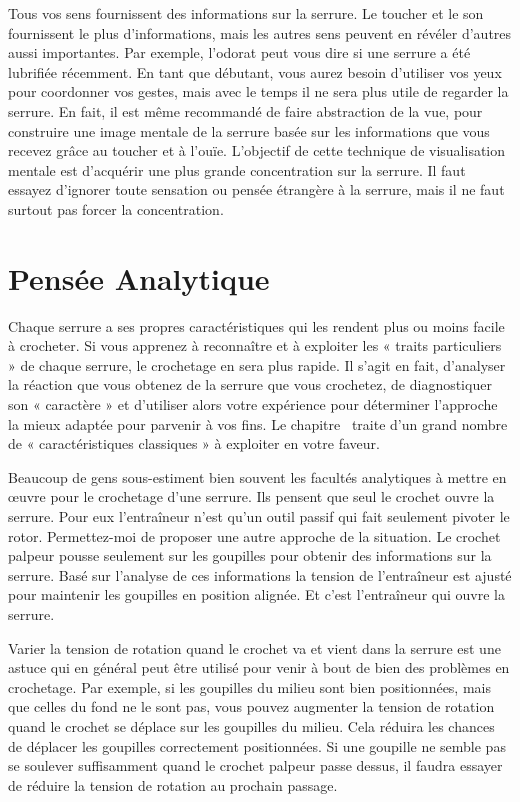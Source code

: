\documentclass[a4paper,french,11pt,twoside]{report}
\begin{document}
Tous vos sens fournissent des informations sur la serrure. Le toucher et le son fournissent le plus d'informations, mais les autres sens peuvent en révéler d'autres aussi importantes. Par exemple, l'odorat peut vous dire si une serrure a été lubrifiée récemment. En tant que débutant, vous aurez besoin d'utiliser vos yeux pour coordonner vos gestes, mais avec le temps il ne sera plus utile de regarder la serrure. En fait, il est même recommandé de faire abstraction de la vue, pour construire une image mentale de la serrure basée sur les informations que vous recevez grâce au toucher et à l'ouïe. L'objectif de cette technique de visualisation mentale est d'acquérir une plus grande concentration sur la serrure. Il faut essayez d'ignorer toute sensation ou pensée étrangère à la serrure, mais il ne faut surtout pas forcer la concentration.

\section{Pensée Analytique}

Chaque serrure a ses propres caractéristiques qui les rendent plus ou moins facile à crocheter. Si vous apprenez à reconnaître et à exploiter les « traits particuliers » de chaque serrure, le crochetage en sera plus rapide. Il s'agit en fait, d'analyser la réaction que vous obtenez de la serrure que vous crochetez, de diagnostiquer son « caractère » et d'utiliser alors votre expérience pour déterminer l'approche la mieux adaptée pour parvenir à vos fins. Le chapitre~ traite d'un grand nombre de « caractéristiques  classiques » à exploiter en votre faveur.

Beaucoup de gens sous-estiment bien souvent les facultés analytiques à mettre en œuvre pour le crochetage d'une serrure. Ils pensent que seul le crochet ouvre la serrure. Pour eux l'entraîneur n'est qu'un outil passif qui fait seulement pivoter le rotor. Permettez-moi de proposer une autre approche de la situation. Le crochet palpeur pousse seulement sur les goupilles pour obtenir des informations sur la serrure. Basé sur l'analyse de ces informations la tension de l'entraîneur est ajusté pour maintenir les goupilles en position alignée. Et c'est l'entraîneur qui ouvre la serrure.

Varier la tension de rotation quand le crochet va et vient dans la serrure est une astuce qui en général peut être utilisé pour venir à bout de bien des problèmes en crochetage. Par exemple, si les goupilles du milieu sont bien positionnées, mais que celles du fond ne le sont pas, vous pouvez augmenter la tension de rotation quand le crochet se déplace sur les goupilles du milieu. Cela réduira les chances de déplacer les goupilles correctement positionnées. Si une goupille ne semble pas se soulever suffisamment quand le crochet palpeur passe dessus, il faudra essayer de réduire la tension de rotation au prochain passage.
\end{document}
